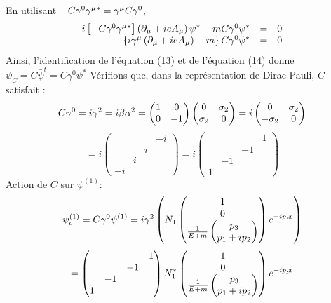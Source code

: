 En utilisant $-C\gamma^0\gamma^\mu{^*}=\gamma^\mu C\gamma^0$,
\[
\begin{array}{ r c l }
i\left[-C\gamma^0\gamma^\mu{^*}\right]\left(\partial_\mu+ieA_\mu\right)\psi^*-mC\gamma^0\psi^* & = & 0 \\
\left\{i\gamma^\mu\left(\partial_\mu+ieA_\mu\right)-m\right\}C\gamma^0\psi^* & = & 0 \\
\end{array}
\]
Ainsi, l’identification de l’équation (13) et de l’équation (14) donne
$\psi_C = C\bar{\psi}^t = C\gamma^0\psi^*$
Vérifions que, dans la représentation de Dirac-Pauli, $C$ satisfait :
\[
C\gamma^0=i\gamma^2=i\beta\alpha^2=\begin{pmatrix}1&0\\0&-1\end{pmatrix}
\begin{pmatrix}0&\sigma_2\\\sigma_2&0\end{pmatrix}=i\begin{pmatrix}0&\sigma_2\\-\sigma_2&0\end{pmatrix}
\]
\[\tag{15} =i\begin{pmatrix}&&&-i\\&&i&\\&i&&\\-i&&&\end{pmatrix}
=i\begin{pmatrix}&&&1\\&&-1&\\&-1&&\\1&&&\end{pmatrix}
\]
Action de $C$ sur $\psi^{(1)}:$
\[
\psi^{(1)}_c=C\gamma^0\psi^{(1)}=i\gamma^2\left(N_1\begin{pmatrix}1\\0\\\frac{1}{E+m}
\begin{pmatrix}p_3\\p_1+ip_2\end{pmatrix}\end{pmatrix}e^{-ip\underline{.}x}\right)
\]
\[
=\begin{pmatrix}&&&1\\&&-1&\\&-1&&\\1&&&\end{pmatrix}N^*_1
\begin{pmatrix}1\\0\\\frac{1}{E+m}
\begin{pmatrix}p_3\\p_1+ip_2\end{pmatrix}\end{pmatrix}e^{-ip\underline{.}x}
\]
